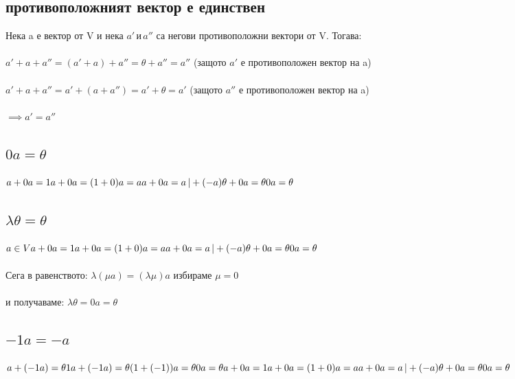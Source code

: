 \documentclass[12pt]{article}
\begin{document}
    \subsection{противоположният вектор е единствен}
    Нека a е вектор от V и нека \(a' \, \text{и} \, a''\) са негови противоположни вектори от V. Тогава:\\\\
    \(a' + a + a'' = (a' + a) + a'' = \theta + a'' = a''\) (защото \(a'\) е противоположен вектор на a)\\\\
    \(a' + a + a'' = a' + (a + a'') = a' + \theta = a'\) (защото \(a''\) е противоположен вектор на a)\\\\
    \(\implies a' = a''\)
    \subsection{\(0a = \theta\)}
    \(a + 0a = 1a + 0a = (1 + 0)a = a\\\\
    a + 0a = a \, | + (-a)\\\\
    \theta + 0a = \theta\\\\
    0a = \theta\)
    \subsection{\(\lambda \theta = \theta\)}
    \(a \in V\\\\
    a + 0a = 1a + 0a = (1 + 0)a = a\\\\
    a + 0a = a \, | + (-a)\\\\
    \theta + 0a = \theta\\\\
    0a = \theta\)\\\\
    Сега в равенството: \(\lambda(\mu a) = (\lambda \mu)a \) избираме \(\mu = 0\) \\\\
    и получаваме: \(\lambda \theta = 0a = \theta\)
    \subsection{\(-1a = -a\)}
    \(a + (-1a) = \theta\\\\
    1a + (-1a) = \theta\\\\
    (1 + (-1))a = \theta\\\\
    0a = \theta\\\\
    a + 0a = 1a + 0a = (1 + 0)a = a\\\\
    a + 0a = a \, | + (-a)\\\\
    \theta + 0a = \theta\\\\
    0a = \theta\)
\end{document}
